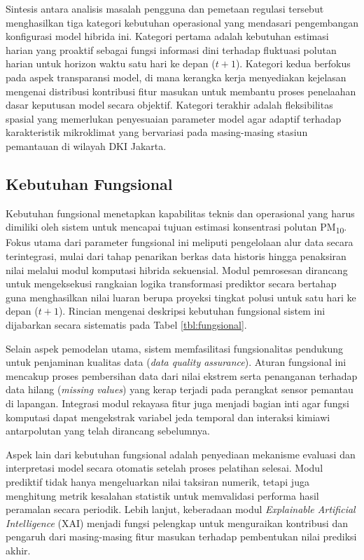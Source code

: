 Sintesis antara analisis masalah pengguna dan pemetaan regulasi tersebut menghasilkan tiga kategori kebutuhan operasional yang mendasari pengembangan konfigurasi model hibrida ini. Kategori pertama adalah kebutuhan estimasi harian yang proaktif sebagai fungsi informasi dini terhadap fluktuasi polutan harian untuk horizon waktu satu hari ke depan ($t+1$). Kategori kedua berfokus pada aspek transparansi model, di mana kerangka kerja menyediakan kejelasan mengenai distribusi kontribusi fitur masukan untuk membantu proses penelaahan dasar keputusan model secara objektif. Kategori terakhir adalah fleksibilitas spasial yang memerlukan penyesuaian parameter model agar adaptif terhadap karakteristik mikroklimat yang bervariasi pada masing-masing stasiun pemantauan di wilayah DKI Jakarta.

\subsection{Kebutuhan Fungsional}

Kebutuhan fungsional menetapkan kapabilitas teknis dan operasional yang harus dimiliki oleh sistem untuk mencapai tujuan estimasi konsentrasi polutan PM\textsubscript{10}. Fokus utama dari parameter fungsional ini meliputi pengelolaan alur data secara terintegrasi, mulai dari tahap penarikan berkas data historis hingga penaksiran nilai melalui modul komputasi hibrida sekuensial. Modul pemrosesan dirancang untuk mengeksekusi rangkaian logika transformasi prediktor secara bertahap guna menghasilkan nilai luaran berupa proyeksi tingkat polusi untuk satu hari ke depan ($t+1$). Rincian mengenai deskripsi kebutuhan fungsional sistem ini dijabarkan secara sistematis pada Tabel \ref{tbl:fungsional}.

Selain aspek pemodelan utama, sistem memfasilitasi fungsionalitas pendukung untuk penjaminan kualitas data (\textit{data quality assurance}). Aturan fungsional ini mencakup proses pembersihan data dari nilai ekstrem serta penanganan terhadap data hilang (\textit{missing values}) yang kerap terjadi pada perangkat sensor pemantau di lapangan. Integrasi modul rekayasa fitur juga menjadi bagian inti agar fungsi komputasi dapat mengekstrak variabel jeda temporal dan interaksi kimiawi antarpolutan yang telah dirancang sebelumnya.

Aspek lain dari kebutuhan fungsional adalah penyediaan mekanisme evaluasi dan interpretasi model secara otomatis setelah proses pelatihan selesai. Modul prediktif tidak hanya mengeluarkan nilai taksiran numerik, tetapi juga menghitung metrik kesalahan statistik untuk memvalidasi performa hasil peramalan secara periodik. Lebih lanjut, keberadaan modul \textit{Explainable Artificial Intelligence} (XAI) menjadi fungsi pelengkap untuk menguraikan kontribusi dan pengaruh dari masing-masing fitur masukan terhadap pembentukan nilai prediksi akhir.

